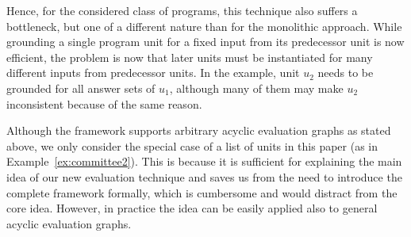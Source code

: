 \documentclass[11pt,fleqn,twoside]{article}
\begin{document}
			Hence, for the considered class of programs, this technique also suffers a bottleneck,
			but one of a different nature than for the monolithic approach.
			While grounding a single program unit for a fixed input from its predecessor unit is now efficient,
			the problem is now that later units must be instantiated for many different inputs from predecessor units.
			In the example, unit $u_2$ needs to be grounded for all answer sets of $u_1$, although many of them
			may make $u_2$ inconsistent because of the same reason.

			Although the framework supports arbitrary acyclic evaluation graphs as stated above,
			we only consider the special case of a list of units in this paper (as in Example~\ref{ex:committee2}).
			This is because it is sufficient for explaining the main idea of our new evaluation technique
			and saves us from the need to introduce the complete framework formally, which is cumbersome
			and would distract from the core idea. However, in practice the idea can be easily applied
			also to general acyclic evaluation graphs.
\end{document}
